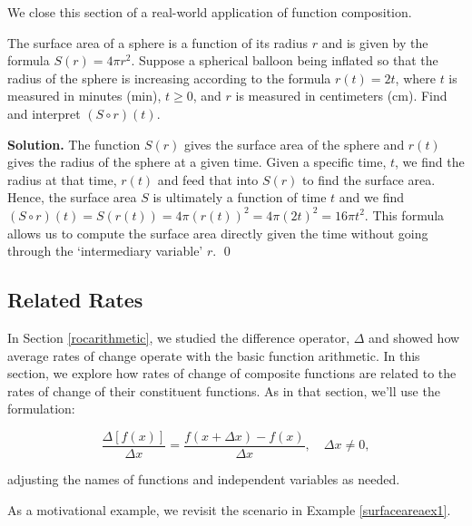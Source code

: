 We close this section of a real-world application of function composition.

\begin{ex}\label{surfaceareaex1}  The surface area of a sphere is a function of its radius $r$ and is given by the formula $S(r) = 4 \pi r^2$.    Suppose a spherical balloon being inflated so that the radius of the sphere is increasing according to the formula $r(t) = 2t$, where $t$ is measured in minutes (min), $t \geq 0$, and $r$ is measured in centimeters (cm).  Find and interpret $(S \circ r)(t)$.

\medskip

{\bf Solution.}  The function  $S(r)$ gives the surface area of the sphere and $r(t)$ gives the radius of the sphere at a given time.    Given a specific time, $t$, we find the radius at that time, $r(t)$ and feed that into $S(r)$ to find the surface area. Hence,  the surface area $S$ is ultimately a function of time $t$ and we find $(S \circ r)(t) = S(r(t)) = 4 \pi (r(t))^2 = 4 \pi \left(2t\right)^2 = 16 \pi t^{2}$.  This formula allows us to compute the surface area directly given the time without going through the `intermediary variable' $r$. \qed

\end{ex}

\subsection{Related Rates}
\label{RelatedRates}

In Section \ref{rocarithmetic}, we studied the difference operator, $\Delta$ and showed how average rates of change operate with the basic function arithmetic.  In this section, we explore how rates of change of composite functions are related to the rates of change of their constituent functions. As in that section, we'll use the formulation:

\[ \dfrac{\Delta[f(x)]}{\Delta x} = \dfrac{f(x+\Delta x)-f(x)}{\Delta x}, \quad \Delta x \neq 0,\]

 adjusting the names of functions and independent variables as needed. 
 
 
 \medskip
 
 As a motivational example, we revisit the scenario in  Example \ref{surfaceareaex1}.

\medskip

